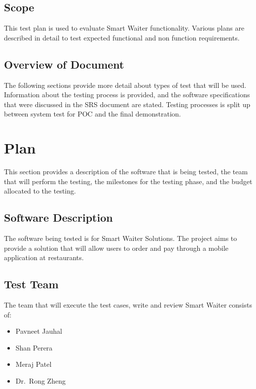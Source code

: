 \documentclass[12pt]{article}
\begin{document}
\subsection{Scope}
This test plan is used to evaluate Smart Waiter functionality. Various plans are described in detail to test expected functional and non function requirements.  

\subsection{Overview of Document }
The following sections provide more detail about types of test that will be used. Information about the testing process is provided, and the software specifications
that were discussed in the SRS document are stated. Testing processes is split up between system test for POC and the final demonstration. 

%
%

\section{Plan}
This section provides a description of the software that is being tested, the team that will
perform the testing, the milestones for the testing phase, and the budget allocated to the testing. 

\subsection{Software Description}
The software being tested is for Smart Waiter Solutions. The project aims to provide a solution that will allow users to order and pay through a mobile application at restaurants. 

\subsection{Test Team} 
The team that will execute the test cases, write and review Smart Waiter consists of:

\begin{itemize}
 \item Pavneet Jauhal
 \item Shan Perera
 \item Meraj Patel
 \item Dr.\ Rong Zheng
\end{itemize}  
\end{document}
